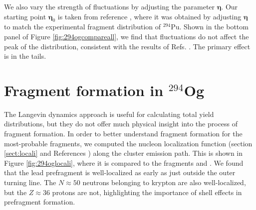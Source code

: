 We also vary the strength of fluctuations by adjusting the parameter $\mathbf{\eta}$. Our starting point $\mathbf{\eta}_0$ is taken from reference \cite{Sadhukhan2016}, where it was obtained by adjusting $\mathbf{\eta}$ to match the experimental fragment distribution of $^{294}$Pu. Shown in the bottom panel of Figure \ref{fig:294ogcompareall}, we find that fluctuations do not affect the peak of the distribution, consistent with the results of Refs. \cite{Randrup2011,Sierk2017,Sadhukhan2017}. The primary effect is in the tails.

\section{Fragment formation in $^{294}$Og}

The Langevin dynamics approach is useful for calculating total yield distributions, but they do not offer much physical insight into the process of fragment formation. In order to better understand fragment formation for the most-probable fragments, we computed the nucleon localization function (section \ref{sect:locali} and References \cite{Zhang2016,Sadhukhan2017}) along the cluster emission path. This is shown in Figure \ref{fig:294oglocali}, where it is compared to the fragments {\Pb} and {\Kr}. We found that the lead prefragment is well-localized as early as just outside the outer turning line. The $N\approx50$ neutrons belonging to krypton are also well-localized, but the $Z\approx36$ protons are not, highlighting the importance of shell effects in prefragment formation.

